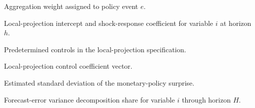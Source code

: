 \begin{description}[leftmargin=4.4cm,style=nextline]
  \item[\(\omega_e\)] Aggregation weight assigned to policy event \(e\).
  \item[\(\alpha_{i,h},\beta_{i,h}\)] Local-projection intercept and shock-response coefficient for variable \(i\) at horizon \(h\).
  \item[\(\vect{X}_{t-1}\)] Predetermined controls in the local-projection specification.
  \item[\(\vect{\Gamma}_{i,h}\)] Local-projection control coefficient vector.
  \item[\(\widehat{\sigma}_{\surprise}\)] Estimated standard deviation of the monetary-policy surprise.
  \item[\(\FEVD_i(H)\)] Forecast-error variance decomposition share for variable \(i\) through horizon \(H\).
\end{description}

\cleardoublepage
